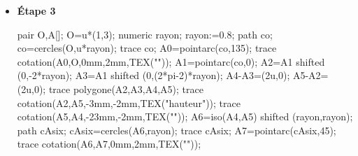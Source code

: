 \begin{methode*1}
\begin{multicols}{3}
\begin{itemize}
                \medskip
                \hspace*{-15mm}
                \begin{Geometrie}
                    pair O,A[];
                    O=u*(1,3);
                    numeric rayon;
                    rayon:=0.8;
                    path co;
                    co=cercles(O,u*rayon);
                    trace co;
                    A0=pointarc(co,135);
                    trace cotation(A0,O,0mm,2mm,TEX("\tiny{}"));                    
                    A1=pointarc(co,0);
                    A2=A1 shifted (0,-2*rayon);
                    A3=A1 shifted (0,(2*pi-2)*rayon);
                    A4-A3=(2u,0);
                    A5-A2=(2u,0);
                    trace polygone(A2,A3,A4,A5);
                    trace cotation(A2,A5,-3mm,-2mm,TEX("\tiny hauteur"));
                    trace cotation(A5,A4,-3mm,-2mm,TEX("\tiny{}"));
                \end{Geometrie}
                \columnbreak
                \item \textbf{Étape 3}
                
                \medskip
                \hspace*{-15mm}
                \begin{Geometrie}
                    pair O,A[];
                    O=u*(1,3);
                    numeric rayon;
                    rayon:=0.8;
                    path co;
                    co=cercles(O,u*rayon);
                    trace co;
                    A0=pointarc(co,135);
                    trace cotation(A0,O,0mm,2mm,TEX("\tiny{}"));                    
                    A1=pointarc(co,0);
                    A2=A1 shifted (0,-2*rayon);
                    A3=A1 shifted (0,(2*pi-2)*rayon);
                    A4-A3=(2u,0);
                    A5-A2=(2u,0);
                    trace polygone(A2,A3,A4,A5);
                    trace cotation(A2,A5,-3mm,-2mm,TEX("\tiny hauteur"));
                    trace cotation(A5,A4,-23mm,-2mm,TEX("\tiny{}"));
                    A6=iso(A4,A5) shifted (rayon,rayon);
                    path cAsix;
                    cAsix=cercles(A6,rayon);
                    trace cAsix;
                    A7=pointarc(cAsix,45);
                    trace cotation(A6,A7,0mm,2mm,TEX("\tiny{}"));
                \end{Geometrie}
            \end{itemize}
        \end{multicols}
        \vspace*{-10mm}
    \end{methode*1}
 

